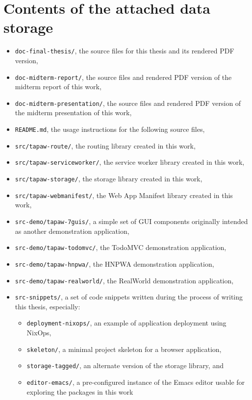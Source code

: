 \documentclass[english,zadani,odsaz]{fitthesis}
\begin{document}
\begin{flushleft}

\end{flushleft}
\iftwoside\cleardoublepage\fi

\appendix
\appendixpage
\iftwoside\cleardoublepage\fi

\startcontents[chapters]
\iftwoside\cleardoublepage\fi

\chapter{Contents of the attached data storage}
\label{sec:orga9fb439}

\begin{itemize}
\item \texttt{doc-final-thesis/}, the source files for this thesis and its rendered PDF
version,
\item \texttt{doc-midterm-report/}, the source files and rendered PDF version of the midterm
report of this work,
\item \texttt{doc-midterm-presentation/}, the source files and rendered PDF version of the midterm
presentation of this work,
\item \texttt{README.md}, the usage instructions for the following source files,
\item \texttt{src/tapaw-route/}, the routing library created in this work,
\item \texttt{src/tapaw-serviceworker/}, the service worker library created in this work,
\item \texttt{src/tapaw-storage/}, the storage library created in this work,
\item \texttt{src/tapaw-webmanifest/}, the Web App Manifest library created in this work,
\item \texttt{src-demo/tapaw-7guis/}, a simple set of GUI components originally intended as
another demonstration application,
\item \texttt{src-demo/tapaw-todomvc/}, the TodoMVC demonstration application,
\item \texttt{src-demo/tapaw-hnpwa/}, the HNPWA demonstration application,
\item \texttt{src-demo/tapaw-realworld/}, the RealWorld demonstration application,
\item \texttt{src-snippets/}, a set of code snippets written during the process of writing
this thesis, especially:
\begin{itemize}
\item \texttt{deployment-nixops/}, an example of application deployment using NixOps,
\item \texttt{skeleton/}, a minimal project skeleton for a browser application,
\item \texttt{storage-tagged/}, an alternate version of the storage library, and
\item \texttt{editor-emacs/}, a pre-configured instance of the Emacs editor usable for
exploring the packages in this work
\end{itemize}
\end{itemize}
\end{document}
